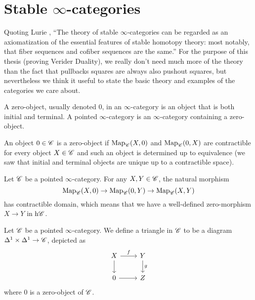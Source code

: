 \documentclass[../../thesis.tex]{subfiles}
\begin{document}
\section{Stable $\infty$-categories}
Quoting Lurie \cite{HA}, ``The theory of stable $\infty$-categories can be regarded as an axiomatization of the essential features of stable homotopy theory: most notably, that fiber sequences and cofiber sequences are the same.''
For the purpose of this thesis (proving Verider Duality), we really don't need much more of the theory than the fact that pullbacks squares are always also pushout squares, but nevertheless we think it useful to state the basic theory and examples of the categories we care about.
\begin{definition}[{\cite[Definition 1.1.1.1.]{HA}}]
    A zero-object, usually denoted $0$, in an $\infty$-category is an object that is both initial and terminal.
    A pointed $\infty$-category is an $\infty$-category containing a zero-object.
\end{definition}
\begin{remark}
    An object $0\in \mathscr{C}$ is a zero-object if $\mathrm{Map}_{\mathscr{C}}(X,0)$ and $\mathrm{Map}_{\mathscr{C}}(0,X)$ are contractible for every object $X\in \mathscr{C}$ and such an object is determined up to equivalence (we saw that initial and terminal objects are unique up to a contractible space).
\end{remark}
\begin{remark}[{\cite{HA}[Remark 1.1.1.3.]}]
    Let $\mathscr{C}$ be a pointed $\infty$-category.
    For any $X,Y \in \mathscr{C}$, the natural morphism
    \[
        \mathrm{Map}_{\mathscr{C}}(X, 0) \to \mathrm{Map}_{\mathscr{C}}(0, Y) \to \mathrm{Map}_{\mathscr{C}}(X,Y)
    \]
    has contractible domain, which means that we have a well-defined zero-morphism $X\to Y$ in $\mathrm{h}\mathscr{C}$.
\end{remark}
\begin{definition}[{\cite{HA}[Definition 1.1.1.4.]}]
    Let $\mathscr{C}$ be a pointed $\infty$-category.
    We define a triangle in $\mathscr{C}$ to be a diagram $\Delta^1 \times \Delta^1 \to \mathscr{C}$, depicted as
    \begin{equation}\label{triangle}\begin{tikzcd}
            X & Y \\
            0 & Z
            \arrow["f", from=1-1, to=1-2]
            \arrow[from=2-1, to=2-2]
            \arrow["g", from=1-2, to=2-2]
            \arrow[from=1-1, to=2-1]
        \end{tikzcd}\end{equation}
    where $0$ is a zero-object of $\mathscr{C}$.
\end{definition}
\end{document}
